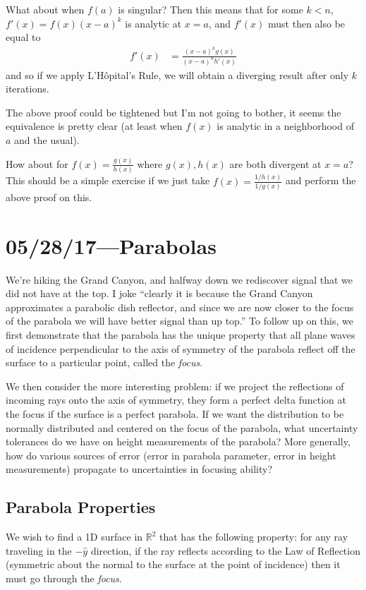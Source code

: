 \documentclass[12pt]{report}
\begin{document}
What about when $f(a)$ is singular? Then this means that for some $k < n$,
$f'(x) = f(x)(x - a)^k$ is analytic at $x = a$, and $f'(x)$ must then
also be equal to
\begin{align*}
    f'(x) &= \frac{(x - a)^kg(x)}{(x - a)^nh'(x)}
\end{align*}
and so if we apply L'H\^opital's Rule, we will obtain a diverging result after
only $k$ iterations.

The above proof could be tightened but I'm not going to bother, it seems the
equivalence is pretty clear (at least when $f(x)$ is analytic in a neighborhood
of $a$ and the usual).

How about for $f(x) = \frac{g(x)}{h(x)}$ where $g(x), h(x)$ are both divergent
at $x = a$? This should be a simple exercise if we just take $f(x) =
\frac{1/h(x)}{1/g(x)}$ and perform the above proof on this.

\chapter{05/28/17---Parabolas}

We're hiking the Grand Canyon, and halfway down we rediscover signal that we
did not have at the top. I joke ``clearly it is because the Grand Canyon
approximates a parabolic dish reflector, and since we are now closer to the
focus of the parabola we will have better signal than up top.'' To follow up on
this, we first demonstrate that the parabola has the unique property that all
plane waves of incidence perpendicular to the axis of symmetry of the parabola
reflect off the surface to a particular point, called the \emph{focus}.

We then consider the more interesting problem: if we project the reflections of
incoming rays onto the axis of symmetry, they form a perfect delta function at
the focus if the surface is a perfect parabola. If we want the distribution to
be normally distributed and centered on the focus of the parabola, what
uncertainty tolerances do we have on height measurements of the parabola? More
generally, how do various sources of error (error in parabola parameter, error
in height measurements) propagate to uncertainties in focusing ability?

\section{Parabola Properties}

We wish to find a 1D surface in $\mathbb{R}^2$ that has the following property:
for any ray traveling in the $-\hat{y}$ direction, if the ray reflects according
to the Law of Reflection (symmetric about the normal to the surface at the point
of incidence) then it must go through the \emph{focus}.
\end{document}
